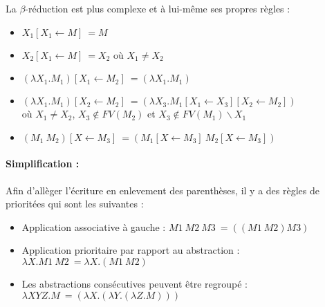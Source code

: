 \documentclass[10pt,a4paper]{article}
\begin{document}
				
				La $\beta$-réduction est plus complexe et à lui-même ses propres règles :
				\begin{itemize}
					\item $X_{1}[X_{1} \leftarrow M]~= M$
					\item $X_{2}[X_{1} \leftarrow M]~= X_{2}$ où $X_{1}\neq X_{2}$
					\item $(\lambda X_{1}.M_{1})[X_{1} \leftarrow M_{2}]~= (\lambda X_{1}.M_{1})$
					\item $(\lambda X_{1}.M_{1})[X_{2} \leftarrow M_{2}]~= (\lambda X_{3}.M_{1}[X_{1} \leftarrow X_{3}][X_{2} \leftarrow M_{2}])$ 
					\\où $X_{1} \neq X_{2}$, $X_{3} \notin FV(M_{2})$ et $X_{3} \notin FV(M_{1})\backslash{X_{1}}$ 
					\item $(M_{1}~M_{2})[X \leftarrow M_{3}]~=(M_{1}[X \leftarrow M_{3}]~M_{2}[X \leftarrow M_{3}])$
				\end{itemize}
				\bigbreak
			
			
				\paragraph{Simplification :}Afin d'allèger l'écriture en enlevement des parenthèses, il y a des règles de prioritées qui sont les suivantes :
				\begin{itemize}
					\item Application associative à gauche : $M1~M2~M3~= ((M1~M2)M3)$
					\item Application prioritaire par rapport au abstraction : $\lambda X.M1~M2~= \lambda X.(M1~M2)$
					\item Les abstractions consécutives peuvent être regroupé : $\lambda XYZ.M~= (\lambda X.(\lambda Y.(\lambda Z.M)))$
				\end{itemize}
				\medbreak
				
\end{document}
